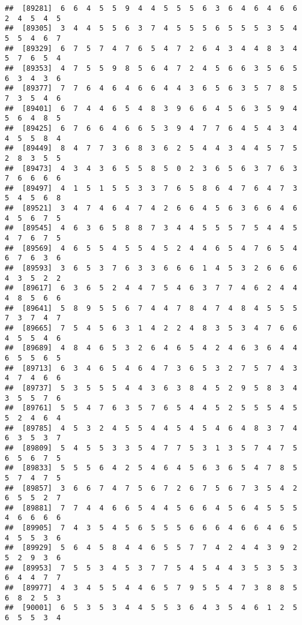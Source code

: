 \documentclass[
]{book}
\begin{document}
\begin{verbatim}
##  [89281]  6  6  4  5  5  9  4  4  5  5  5  6  3  6  4  6  4  6  6  2  4  5  4  5
##  [89305]  3  4  4  5  5  6  3  7  4  5  5  5  6  5  5  5  3  5  4  5  5  4  6  7
##  [89329]  6  7  5  7  4  7  6  5  4  7  2  6  4  3  4  4  8  3  4  5  7  6  5  4
##  [89353]  4  7  5  5  9  8  5  6  4  7  2  4  5  6  6  3  5  6  5  6  3  4  3  6
##  [89377]  7  7  6  4  6  4  6  6  4  4  3  6  5  6  3  5  7  8  5  7  3  5  4  6
##  [89401]  6  7  4  4  6  5  4  8  3  9  6  6  4  5  6  3  5  9  4  5  6  4  8  5
##  [89425]  6  7  6  6  4  6  6  5  3  9  4  7  7  6  4  5  4  3  4  4  5  5  8  4
##  [89449]  8  4  7  7  3  6  8  3  6  2  5  4  4  3  4  4  5  7  5  2  8  3  5  5
##  [89473]  4  3  4  3  6  5  5  8  5  0  2  3  6  5  6  3  7  6  3  7  6  6  6  6
##  [89497]  4  1  5  1  5  5  3  3  7  6  5  8  6  4  7  6  4  7  3  5  4  5  6  8
##  [89521]  3  4  7  4  6  4  7  4  2  6  6  4  5  6  3  6  6  4  6  4  5  6  7  5
##  [89545]  4  6  3  6  5  8  8  7  3  4  4  5  5  5  7  5  4  4  5  4  7  6  7  5
##  [89569]  4  6  5  5  4  5  5  4  5  2  4  4  6  5  4  7  6  5  4  6  7  6  3  6
##  [89593]  3  6  5  3  7  6  3  3  6  6  6  1  4  5  3  2  6  6  6  4  3  5  2  2
##  [89617]  6  3  6  5  2  4  4  7  5  4  6  3  7  7  4  6  2  4  4  4  8  5  6  6
##  [89641]  5  8  9  5  5  6  7  4  4  7  8  4  7  4  8  4  5  5  5  7  3  7  4  7
##  [89665]  7  5  4  5  6  3  1  4  2  2  4  8  3  5  3  4  7  6  6  4  5  5  4  6
##  [89689]  4  8  4  6  5  3  2  6  4  6  5  4  2  4  6  3  6  4  4  6  5  5  6  5
##  [89713]  6  3  4  6  5  4  6  4  7  3  6  5  3  2  7  5  7  4  3  4  7  4  6  6
##  [89737]  5  3  5  5  5  4  4  3  6  3  8  4  5  2  9  5  8  3  4  3  5  5  7  6
##  [89761]  5  5  4  7  6  3  5  7  6  5  4  4  5  2  5  5  5  4  5  5  2  4  6  4
##  [89785]  4  5  3  2  4  5  5  4  4  5  4  5  4  6  4  8  3  7  4  6  3  5  3  7
##  [89809]  5  4  5  5  3  3  5  4  7  7  5  3  1  3  5  7  4  7  5  6  5  6  7  5
##  [89833]  5  5  5  6  4  2  5  4  6  4  5  6  3  6  5  4  7  8  5  5  7  4  7  5
##  [89857]  3  6  6  7  4  7  5  6  7  2  6  7  5  6  7  3  5  4  2  6  5  5  2  7
##  [89881]  7  7  4  4  6  6  5  4  4  5  6  6  4  5  6  4  5  5  5  4  6  6  6  6
##  [89905]  7  4  3  5  4  5  6  5  5  5  6  6  6  4  6  6  4  6  5  4  5  5  3  6
##  [89929]  5  6  4  5  8  4  4  6  5  5  7  7  4  2  4  4  3  9  2  5  2  9  3  6
##  [89953]  7  5  5  3  4  5  3  7  7  5  4  5  4  4  3  5  3  5  3  6  4  4  7  7
##  [89977]  4  3  4  5  5  4  4  6  5  7  9  5  5  4  7  3  8  8  5  6  8  2  5  3
##  [90001]  6  5  3  5  3  4  4  5  5  3  6  4  3  5  4  6  1  2  5  6  5  5  3  4

\end{verbatim}
\end{document}
